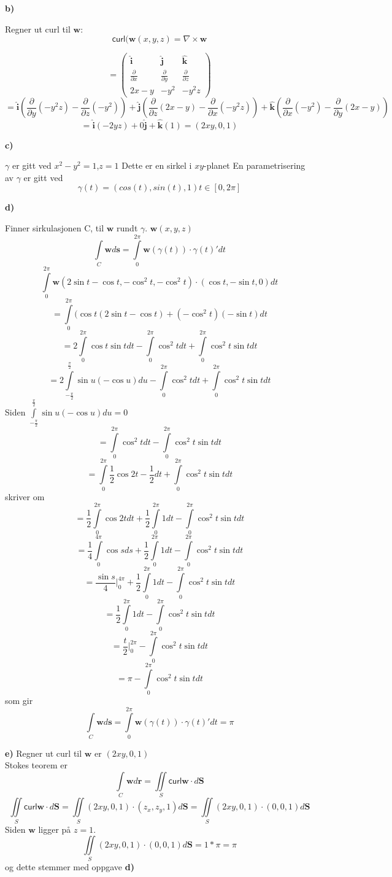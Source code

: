 \documentclass[11pt,a4paper, leqno]{report}
\newcommand{\ihat}{\boldsymbol{\hat{\textbf{i}}}}
\newcommand{\jhat}{\boldsymbol{\hat{\textbf{j}}}}
\newcommand{\khat}{\boldsymbol{\hat{\textbf{k}}}}
\newcommand{\partd}[1]{\frac {\partial} {\partial #1}}
\begin{document}
\textbf{b)}

	Regner ut curl til $\mathbf{w}$:
	$$\mathsf{curl}(\mathbf{w}(x,y,z)=\nabla\times\mathbf{w}$$

		$$=\left( \begin{array}{ccc}
			\ihat &  \jhat &  \khat \\
			\partd x & \partd y & \partd z \\
			2x-y & -y^2 & -y^2z 
		\end{array} \right)$$
		$$=\ihat(\partd y (-y^2z)-\partd z(-y^2))+\jhat(\partd z (2x-y)- \partd x (-y^2z)) +\khat ( \partd x (-y^2) - \partd y (2x-y))$$
		$$=\ihat(-2yz)+ 0\jhat +\khat(1)=(2xy,0,1)$$

\textbf{c)}

	$\gamma$ er gitt ved $x^2-y^2=1$,$z=1$ Dette er en sirkel i $xy$-planet
	En parametrisering av $\gamma$ er gitt ved 
	$$\gamma(t)=(cos(t), sin(t),1) 		 t \in [0,2\pi]$$

\textbf{d)}

	Finner sirkulasjonen C, til $\mathbf{w}$ rundt $\gamma$.
	$\mathbf{w}(x,y,z)$ 
	$$\int\limits_C\mathbf{w}d\mathbf{s} = \int\limits_0^{2\pi}\mathbf{w}(\gamma(t)) \cdot {\gamma(t)}'dt$$
	$$\int\limits_0^{2\pi}\mathbf{w}(2\sin{t}-\cos{t},-\cos^2{t},-\cos^2{t})\cdot(\cos{t},-\sin{t},0)dt$$
	$$=\int\limits_0^{2\pi}(\cos{t}(2\sin{t}-\cos{t}) + (-\cos^2{t})(-\sin{t})dt$$
	$$=2\int\limits_0^{2\pi}\cos{t}\sin{t}dt-\int\limits_0^{2\pi}\cos^2{t}dt+\int\limits_0^{2\pi}\cos^2{t}\sin{t}dt$$
	$$=2\int\limits_{-\frac{\pi}{2}}^{\frac{\pi}{2}}\sin{u}(-\cos{u})du-\int\limits_0^{2\pi}\cos^2{t}dt+\int\limits_0^{2\pi}\cos^2{t}\sin{t}dt$$
Siden $\int\limits_{-\frac{\pi}{2}}^{\frac{\pi}{2}}\sin{u}(-\cos{u})du=0$
	$$=\int\limits_0^{2\pi}\cos^2{t}dt-\int\limits_0^{2\pi}\cos^2{t}\sin{t}dt$$
	$$=\int\limits_0^{2\pi}\frac{1}{2}\cos{2t}-\frac{1}{2} dt+\int\limits_0^{2\pi}\cos^2{t}\sin{t}dt$$
skriver om
	$$=\frac{1}{2}\int\limits_0^{2\pi}\cos{2t}dt+\frac{1}{2} \int\limits_0^{2\pi} 1 dt-\int\limits_0^{2\pi}\cos^2{t}\sin{t}dt$$
	$$=\frac{1}{4}\int\limits_0^{4\pi}\cos{s}ds+\frac{1}{2} \int\limits_0^{2\pi} 1 dt-\int\limits_0^{2\pi}\cos^2{t}\sin{t}dt$$
	$$=\frac{\sin{s}}{4}\Bigg|_0^{4\pi}+\frac{1}{2} \int\limits_0^{2\pi} 1 dt-\int\limits_0^{2\pi}\cos^2{t}\sin{t}dt$$
	$$=\frac{1}{2} \int\limits_0^{2\pi} 1 dt-\int\limits_0^{2\pi}\cos^2{t}\sin{t}dt$$
	$$=\frac{t}{2}\Bigg|_0^{2\pi} -\int\limits_0^{2\pi}\cos^2{t}\sin{t}dt$$
 	$$=\pi-\int\limits_0^{2\pi}\cos^2{t}\sin{t}dt$$
som gir
$$\int\limits_C\mathbf{w}d\mathbf{s} = \int\limits_0^{2\pi}\mathbf{w}(\gamma(t)) \cdot {\gamma(t)}'dt=\pi$$
\newpage



\textbf{e)}
Regner ut curl til $\mathbf{w}$ er $(2xy,0,1)$ \\
Stokes teorem er 
 $$\int\limits_C\mathbf{w}d\mathbf{r} =\iint\limits_S \mathsf{curl}\mathbf{w}\cdot d\mathbf{S}$$
	$$\iint\limits_S \mathsf{curl}\mathbf{w}\cdot d\mathbf{S}=\iint\limits_S (2xy,0,1)\cdot (z_x,z_y,1) d\mathbf{S}=\iint\limits_S (2xy,0,1)\cdot (0,0,1) d\mathbf{S}$$ 
Siden $\mathbf{w}$ ligger på $z=1$.
$$\iint\limits_S (2xy,0,1)\cdot (0,0,1) d\mathbf{S}=1*\pi=\pi$$
og dette stemmer med oppgave \textbf{d)}
\end{document}
